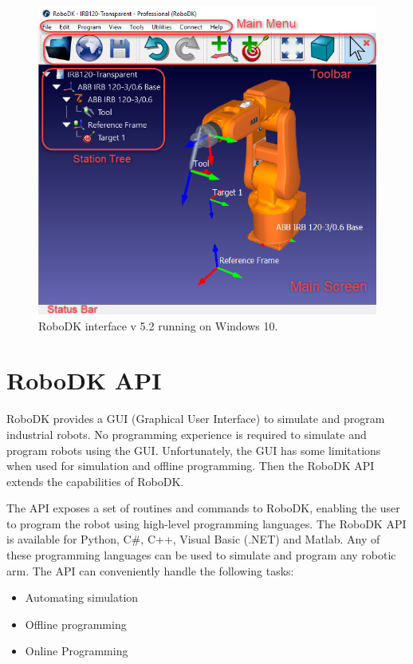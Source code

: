 \begin{figure}[h]
    \centering
    \includegraphics[width=0.9\linewidth]{img/robodk_interface.png}
    \caption{RoboDK interface v 5.2 running on Windows 10.}
    \label{fig:robodkinterface}
\end{figure}

\section{RoboDK API}

RoboDK provides a GUI (Graphical User Interface) to simulate and program industrial robots. No programming experience is required to simulate and program robots using the GUI. Unfortunately, the GUI has some limitations when used for simulation and offline programming. Then the RoboDK API extends the capabilities of RoboDK.

The API exposes a set of routines and commands to RoboDK, enabling the user to program the robot using high-level programming languages. The RoboDK API is available for Python, C#, C++, Visual Basic (.NET) and Matlab. Any of these programming languages can be used to simulate and program any robotic arm. The API can conveniently handle the following tasks:

\begin{itemize}
    \item Automating simulation
    \item Offline programming
    \item Online Programming
\end{itemize}

